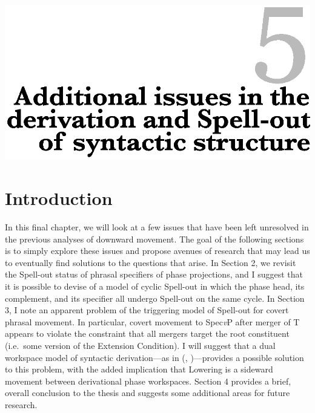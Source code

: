 \setcounter{footnote}{0}
\setcounter{section}{0}
\setcounter{ExNo}{0}
\begin{center}
\includegraphics{chapter5.eps}
\end{center}
\section*{}
\section{Introduction}
In this final chapter, we will look at a few issues that have been left unresolved in the previous analyses of downward movement. The goal of the following sections is to simply explore these issues and propose avenues of research that may lead us to eventually find solutions to the questions that arise. In Section 2, we revisit the Spell-out status of phrasal specifiers of phase projections, and I suggest that it is possible to devise of a model of cyclic Spell-out in which the phase head, its complement, and its specifier all undergo Spell-out on the same cycle. In Section 3, I note an apparent problem of the triggering model of Spell-out for covert phrasal movement. In particular, covert movement to Spec{\it v}P after merger of T appears to violate the constraint that all mergers target the root constituent (i.e.\ some version of the Extension Condition). I will suggest that a dual workspace model of syntactic derivation---as in \citeauthor{nunes2001} (\citeyear{nunes2001}, \citeyear{nunes2004})---provides a possible solution to this problem, with the added implication that Lowering is a sideward movement between derivational phase workspaces. Section 4 provides a brief, overall conclusion to the thesis and suggests some additional areas for future research.

